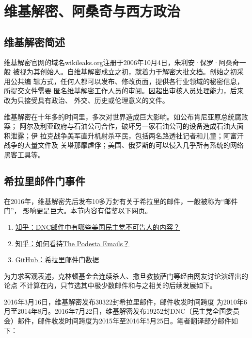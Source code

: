 \chapter{维基解密、阿桑奇与西方政治}

\section{维基解密简述}

维基解密官网的域名wikileaks.org注册于2006年10月4日，朱利安·保罗·阿桑奇一般
被视为其创始人。自维基解密成立之初，就着力于解密大批文档。创始之初采用公共编
辑方式，任何人都可以发布、修改页面，提供各行业领域的秘密信息，所提交文件需要
匿名维基解密工作人员的审阅。因超出审核人员处理能力，后来改为只接受具有政治、
外交、历史或伦理意义的文件。

维基解密在十年多的时间里，多次对世界造成巨大影响。如公布肯尼亚原总统腐败案；
阿尔及利亚政府与石油公司合作，破坏另一家石油公司的设备造成石油大面积泄露；伊
拉克战争美军直升机射杀平民，包括两名路透社记者和儿童；阿富汗战争的大量文件及
关塔那摩虐俘；美国、俄罗斯的可以侵入几乎所有系统的网络黑客工具等。

\section{希拉里邮件门事件}

在2016年，维基解密先后发布10多万封有关于希拉里的邮件，一般被称为“邮件门”，
影响更是巨大。本节内容有借鉴以下网页。
\begin{enumerate}
\item \href{https://www.zhihu.com/question/41676600}{知乎：DNC邮件中有哪些美国民主党不可告人的内容？}

\item \href{https://www.zhihu.com/question/51362588}{知乎：如何看待The Podesta Emails？}

\item \href{https://github.com/zhouningyi/us_selection_crack}{GitHub：希拉里邮件门数据}
\end{enumerate}


为力求客观表述，克林顿基金会连续杀人、撒旦教披萨门等经由网友讨论演绎出的论点
不计算在内，只节选其中极少数邮件和与之相关的后续发展如下。

2016年3月16日，维基解密发布30322封希拉里邮件，邮件收发时间跨度
为2010年6月至2014年8月。2016年7月22日，维基解密发布19252封DNC（民主党全国委员
会）邮件，邮件收发时间跨度为2015年至2016年5月25日。笔者翻译部分邮件如下：

